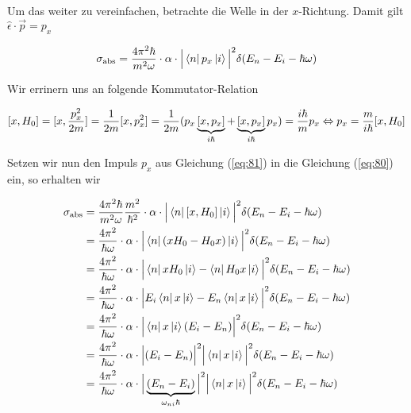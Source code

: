 Um das weiter zu vereinfachen, betrachte die Welle in der \(x\)-Richtung. Damit gilt \(\hat\epsilon \cdot \vec p = p_x \)

\begin{align}
  \label{eq:80}
    \sigma_{\text{abs}} = \frac{4 \pi^2 \hbar }{ m^2 \omega} \cdot \alpha \cdot \Big| \left\langle n \right| p_x \left| i \right\rangle \Big|^2 \delta(E_n - E_i - \hbar\omega)
\end{align}

Wir errinern uns an folgende Kommutator-Relation

\begin{align}
  \label{eq:81}
  [x,H_0] = [x,\frac{p^2_x}{2m}] = \frac{1}{2m}[x,p^2_x] = \frac{1}{2m}(p_x\underbr{[x,p_x]}_{i\hbar} + \underbr{[x,p_x]}_{i\hbar}p_x) = \frac{i\hbar}{m}p_x \Leftrightarrow p_x = \frac{m}{i\hbar}[x,H_0]
\end{align}

Setzen wir nun den Impuls \(p_x\) aus Gleichung (\ref{eq:81}) in die Gleichung (\ref{eq:80}) ein, so erhalten wir

\begin{align}
  \label{eq:82}
    \sigma_{\text{abs}} &= \frac{4 \pi^2 \hbar }{ m^2 \omega} \frac{m^2}{\hbar^2} \cdot \alpha \cdot \Big| \bra{n}[x,H_0]  \ket{i} \Big|^2 \delta(E_n - E_i - \hbar\omega) \notag \\
&= \frac{4 \pi^2  }{\hbar \omega} \cdot \alpha \cdot \Big| \bra{n} (xH_0-H_0x)  \ket{i} \Big|^2 \delta(E_n - E_i - \hbar\omega) \notag \\
&= \frac{4 \pi^2  }{\hbar \omega} \cdot \alpha \cdot \Big| \bra{n}xH_0\ket{i}- \bra{n} H_0x \ket{i} \Big|^2 \delta(E_n - E_i - \hbar\omega) \notag \\
&= \frac{4 \pi^2  }{\hbar \omega} \cdot \alpha \cdot \Big|E_i \bra{n}x\ket{i}- E_n \bra{n} x \ket{i} \Big|^2 \delta(E_n - E_i - \hbar\omega) \notag \\
&= \frac{4 \pi^2  }{\hbar \omega} \cdot \alpha \cdot \Big|\bra{n}x\ket{i}( E_i - E_n) \Big|^2 \delta(E_n - E_i - \hbar\omega) \notag \\
&= \frac{4 \pi^2  }{\hbar \omega} \cdot \alpha \cdot \Big|( E_i - E_n) \Big|^2 \Big|\bra{n}x\ket{i}\Big|^2 \delta(E_n - E_i - \hbar\omega) \notag \\
&= \frac{4 \pi^2  }{\hbar \omega} \cdot \alpha \cdot \Big|\underbr{( E_n - E_i)}_{\omega_{ni}\hbar} \Big|^2 \Big|\bra{n}x\ket{i}\Big|^2 \delta(E_n - E_i - \hbar\omega) \notag \\
\end{align}

